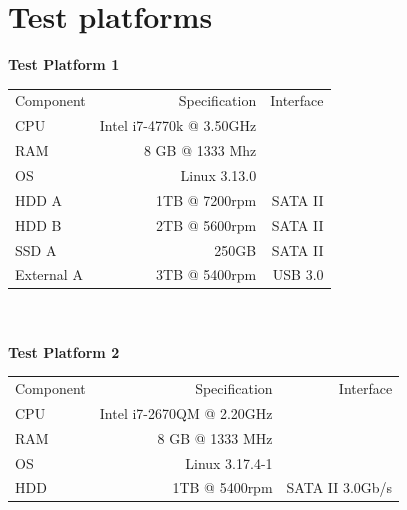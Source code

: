 \documentclass[12pt]{article}
\begin{document}
\section {Test platforms}
\textbf{Test Platform 1}\\
\begin{tabular}{|l|r|r|}
  \hline
  Component & Specification                   & Interface \\
  CPU       & Intel i7-4770k @ 3.50GHz        &           \\
  RAM       & 8 GB @ 1333 Mhz                 &           \\
  OS        & Linux 3.13.0                    &           \\
  HDD A     &         1TB @ 7200rpm           & SATA II   \\
  HDD B     &                 2TB @ 5600rpm   & SATA II   \\
  SSD A     &         250GB                   & SATA II   \\
  External A& 3TB @ 5400rpm                   & USB 3.0   \\
  \hline
\end{tabular}\\\\
\textbf{Test Platform 2}\\
\begin{tabular}{|l|r|r|}
  \hline
  Component & Specification                   & Interface \\
  CPU       & Intel i7-2670QM @ 2.20GHz       &           \\
  RAM       & 8 GB @ 1333 MHz                 &           \\
  OS        & Linux 3.17.4-1                  &           \\
  HDD       & 1TB @ 5400rpm                   & SATA II 3.0Gb/s  \\
  \hline
\end{tabular}
\end{document}
